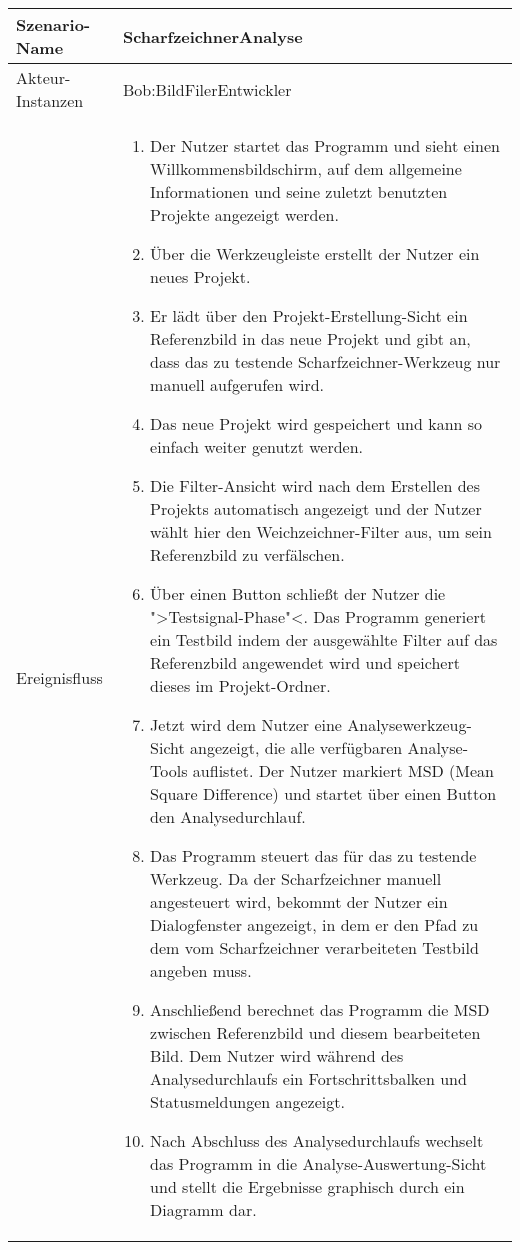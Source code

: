 \begin{tabular}{l|p{12.3cm}}
\hline
Szenario-Name & ScharfzeichnerAnalyse\\
\hline
Akteur-Instanzen &Bob:BildFilerEntwickler\\ %
\hline
Ereignisfluss & 
\begin{enumerate}
\item Der Nutzer startet das Programm und sieht einen Willkommensbildschirm, auf dem allgemeine Informationen und seine zuletzt benutzten Projekte angezeigt werden.
\item Über die Werkzeugleiste erstellt der Nutzer ein neues Projekt.
\item Er lädt über den Projekt-Erstellung-Sicht ein Referenzbild in das neue Projekt und gibt an, dass das zu testende Scharfzeichner-Werkzeug nur manuell aufgerufen wird.
\item Das neue Projekt wird gespeichert und kann so einfach weiter genutzt werden.

\item Die Filter-Ansicht wird nach dem Erstellen des Projekts automatisch angezeigt und der Nutzer wählt hier den Weichzeichner-Filter aus, um sein Referenzbild zu verfälschen.
\item Über einen Button schließt der Nutzer die ">Testsignal-Phase"<. Das Programm generiert ein Testbild indem der ausgewählte Filter auf das Referenzbild angewendet wird und speichert dieses im Projekt-Ordner.
\item Jetzt wird dem Nutzer eine Analysewerkzeug-Sicht angezeigt, die alle verfügbaren Analyse-Tools auflistet. Der Nutzer markiert MSD (Mean Square Difference) und startet über einen Button den Analysedurchlauf.
\item Das Programm steuert das für das zu testende Werkzeug. Da der Scharfzeichner manuell angesteuert wird, bekommt der Nutzer ein Dialogfenster angezeigt, in dem er den Pfad zu dem vom Scharfzeichner verarbeiteten Testbild angeben muss.
\item Anschließend berechnet das Programm die MSD zwischen Referenzbild und diesem bearbeiteten Bild. Dem Nutzer wird während des Analysedurchlaufs ein Fortschrittsbalken und Statusmeldungen angezeigt.
\item Nach Abschluss des Analysedurchlaufs wechselt das Programm in die Analyse-Auswertung-Sicht und stellt die Ergebnisse graphisch durch ein Diagramm dar.
\end{enumerate}\\
\hline
\end{tabular}
